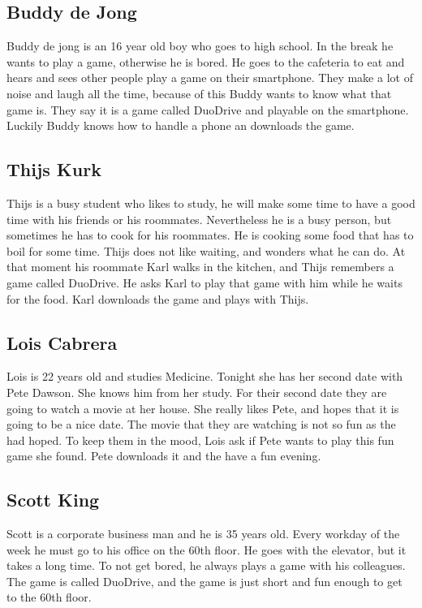 \documentclass{article}
\begin{document}
\subsection{Buddy de Jong}
Buddy de jong is an 16 year old boy who goes to high school. In the break he wants to play a game, otherwise he is bored. He goes to the cafeteria to eat and hears and sees other people play a game on their smartphone. They make a lot of noise and laugh all the time, because of this Buddy wants to know what that game is. They say it is a game called DuoDrive and playable on the smartphone. Luckily Buddy knows how to handle a phone an downloads the game.

\subsection{Thijs Kurk}
Thijs is a busy student who likes to study, he will make some time to have a good time with his friends or his roommates. Nevertheless he is a busy person, but sometimes he has to cook for his roommates. He is cooking some food that has to boil for some time. Thijs does not like waiting, and wonders what he can do. At that moment his roommate Karl walks in the kitchen, and Thijs remembers a game called DuoDrive. He asks Karl to play that game with him while he waits for the food. Karl downloads the game and plays with Thijs.

\subsection{Lois Cabrera}
Lois is 22 years old and studies Medicine. Tonight she has her second date with Pete Dawson. She knows him from her study. For their second date they are going to watch a movie at her house. She really likes Pete, and hopes that it is going to be a nice date. The movie that they are watching is not so fun as the had hoped. To keep them in the mood, Lois ask if Pete wants to play this fun game she found. Pete downloads it and the have a fun evening.

\subsection{Scott King}
Scott is a corporate business man and he is 35 years old. Every workday of the week he must go to his office on the 60th floor. He goes with the elevator, but it takes a long time. To not get bored, he always plays a game with his colleagues. The game is called DuoDrive, and the game is just short and fun enough to get to the 60th floor.
\end{document}
